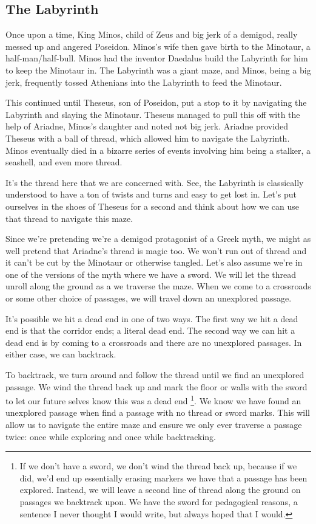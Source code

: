 \subsection{The Labyrinth}
Once upon a time, King Minos, child of Zeus and big jerk of a demigod, really messed up and angered Poseidon.  Minos's wife then gave birth to the Minotaur, a half-man/half-bull.  Minos had the inventor Daedalus build the Labyrinth for him to keep the Minotaur in.  The Labyrinth was a giant maze, and Minos, being a big jerk, frequently tossed Athenians into the Labyrinth to feed the Minotaur.  

This continued until Theseus, son of Poseidon, put a stop to it by navigating the Labyrinth and slaying the Minotaur. Theseus managed to pull this off with the help of Ariadne, Minos's daughter and noted not big jerk. Ariadne provided Theseus with a ball of thread, which allowed him to navigate the Labyrinth. Minos eventually died in a bizarre series of events involving him being a stalker, a seashell, and even more thread.

It's the thread here that we are concerned with.  See, the Labyrinth is classically understood to have a ton of twists and turns and easy to get lost in.  Let's put ourselves in the shoes of Theseus for a second and think about how we can use that thread to navigate this maze.  

Since we're pretending we're a demigod protagonist of a Greek myth, we might as well pretend that Ariadne's thread is magic too.  We won't run out of thread and it can't be cut by the Minotaur or otherwise tangled.  Let's also assume we're in one of the versions of the myth where we have a sword. We will let the thread unroll along the ground as a we traverse the maze.  When we come to a crossroads or some other choice of passages, we will travel down an unexplored passage.  


It's possible we hit a dead end in one of two ways.  The first way we hit a dead end is that the corridor ends;  a literal dead end.  The second way we can hit a dead end is by coming to a crossroads and there are no unexplored passages.  In either case, we can backtrack.

To backtrack, we turn around and follow the thread until we find an unexplored passage.  We wind the thread back up and mark the floor or walls with the sword to let our future selves know this was a dead end \footnote{If we don't have a sword, we don't wind the thread back up, because if we did, we'd end up essentially erasing markers we have that a passage has been explored. Instead, we will leave a second line of thread along the ground on passages we backtrack upon.  We have the sword for pedagogical reasons, a sentence I never thought I would write, but always hoped that I would.}. We know we have found an unexplored passage when find a passage with no thread or sword marks. This will allow us to navigate the entire maze and ensure we only ever traverse a passage twice:  once while exploring and once while backtracking.


